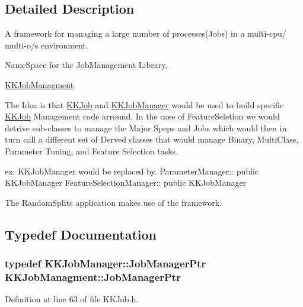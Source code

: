 \subsection{Detailed Description}
A framework for managing a large number of processes(\+Jobs) in a multi-\/cpu/ multi-\/o/s environment. 

Name\+Space for the Job\+Management Library.

\hyperlink{namespace_k_k_job_managment}{K\+K\+Job\+Managment}

The Idea is that \textquotesingle{}\hyperlink{class_k_k_job_managment_1_1_k_k_job}{K\+K\+Job}\textquotesingle{} and \textquotesingle{}\hyperlink{class_k_k_job_managment_1_1_k_k_job_manager}{K\+K\+Job\+Manager}\textquotesingle{} would be used to build specific \hyperlink{class_k_k_job_managment_1_1_k_k_job}{K\+K\+Job} Management code arround. In the case of \textquotesingle{}Feature\+Seletion\textquotesingle{} we would detrive sub-\/classes to manage the Major Speps and Jobs which would then in turn call a different set of Derved classes that would manage Binary, Multi\+Class, Parameter Tuning, and Feature Selection tasks. 
\begin{DoxyCode}
ex:  KKJobManager would be replaced by.
   ParameterManager:: public KKJobManager
   FeatureSelectionManager:: public KKJobManager
\end{DoxyCode}


The Random\+Splits application makes use of the framework. 

\subsection{Typedef Documentation}
\subsubsection[{\texorpdfstring{Job\+Manager\+Ptr}{JobManagerPtr}}]{\setlength{\rightskip}{0pt plus 5cm}typedef {\bf K\+K\+Job\+Manager\+::\+Job\+Manager\+Ptr} {\bf K\+K\+Job\+Managment\+::\+Job\+Manager\+Ptr}}\hypertarget{namespace_k_k_job_managment_aa12a7270f9983ca4ed916533dc8adbc4}{}\label{namespace_k_k_job_managment_aa12a7270f9983ca4ed916533dc8adbc4}


Definition at line 63 of file K\+K\+Job.\+h.

